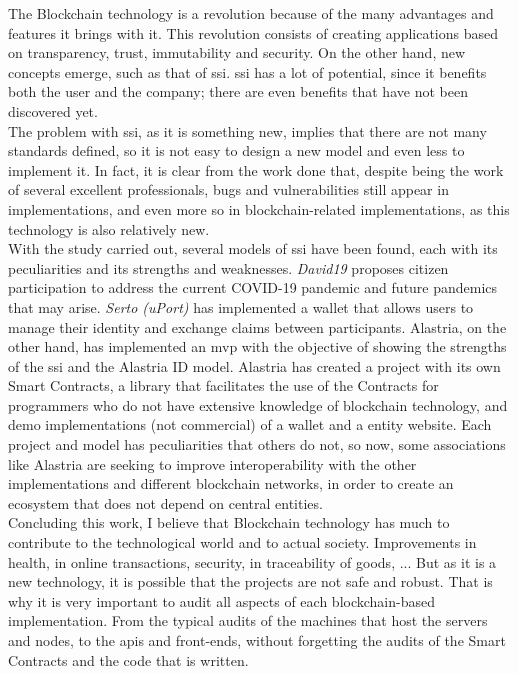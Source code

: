 The Blockchain technology is a revolution because of the many advantages and features it brings with it.  This revolution consists of creating applications based on transparency, trust, immutability and security. On the other hand, new concepts emerge, such as that of \acrlong{ssi}. \acrlong{ssi} has a lot of potential, since it benefits both the user and the company; there are even benefits that have not been discovered yet.\\

The problem with \acrlong{ssi}, as it is something new, implies that there are not many standards defined, so it is not easy to design a new model and even less to implement it. In fact, it is clear from the work done that, despite being the work of several excellent professionals, bugs and vulnerabilities still appear in implementations, and even more so in blockchain-related implementations, as this technology is also relatively new.\\

With the study carried out, several models of \acrshort{ssi} have been found, each with its peculiarities and its strengths and weaknesses. \textit{David19} proposes citizen participation to address the current COVID-19 pandemic and future pandemics that may arise. \textit{Serto (uPort)} has implemented a wallet that allows users to manage their identity and exchange claims between participants. Alastria, on the other hand, has implemented an \acrlong{mvp} with the objective of showing the strengths of the \acrshort{ssi} and the Alastria ID model. Alastria has created a project with its own Smart Contracts, a library that facilitates the use of the Contracts for programmers who do not have extensive knowledge of blockchain technology, and demo implementations (not commercial) of a wallet and a entity website. Each project and model has peculiarities that others do not, so now, some associations like Alastria are seeking to improve interoperability with the other implementations and different blockchain networks, in order to create an ecosystem that does not depend on central entities.\\

Concluding this work, I believe that Blockchain technology has much to contribute to the technological world and to actual society. Improvements in health, in online transactions, security, in traceability of goods, ... But as it is a new technology, it is possible that the projects are not safe and robust. That is why it is very important to audit all aspects of each blockchain-based implementation. From the typical audits of the machines that host the servers and nodes, to the \acrshort{api}s and front-ends, without forgetting the audits of the Smart Contracts and the code that is written.\\

